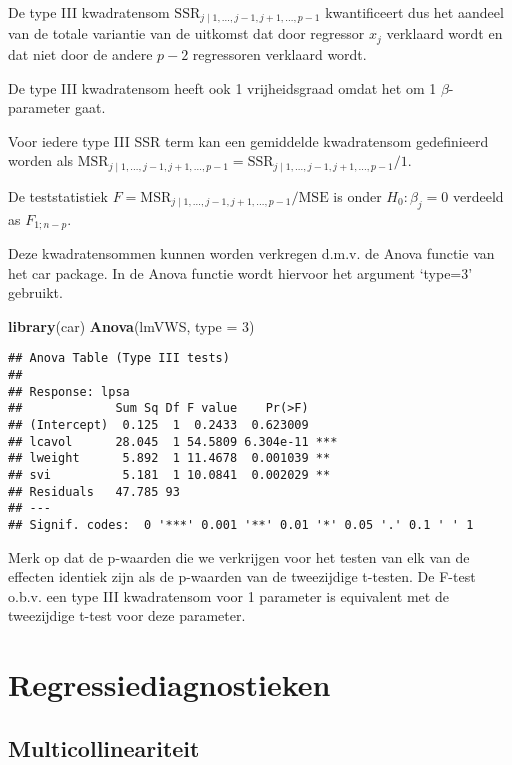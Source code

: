 \documentclass[12pt,dutch,coursenotes]{book}
\newenvironment{Shaded}{\begin{snugshade}}{\end{snugshade}}
\newcommand{\KeywordTok}[1]{\textcolor[rgb]{0.13,0.29,0.53}{\textbf{#1}}}
\newcommand{\DataTypeTok}[1]{\textcolor[rgb]{0.13,0.29,0.53}{#1}}
\newcommand{\DecValTok}[1]{\textcolor[rgb]{0.00,0.00,0.81}{#1}}
\newcommand{\NormalTok}[1]{#1}
\theoremstyle{definition}
\theoremstyle{definition}
\theoremstyle{definition}
\theoremstyle{remark}
\begin{document}
De type III kwadratensom
\(\text{SSR}_{j \mid 1,\ldots, j-1,j+1,\ldots, p-1}\) kwantificeert dus
het aandeel van de totale variantie van de uitkomst dat door regressor
\(x_j\) verklaard wordt en dat niet door de andere \(p-2\) regressoren
verklaard wordt.

De type III kwadratensom heeft ook 1 vrijheidsgraad omdat het om 1
\(\beta\)-parameter gaat.

Voor iedere type III SSR term kan een gemiddelde kwadratensom
gedefinieerd worden als
\(\text{MSR}_{j \mid 1,\ldots, j-1,j+1,\ldots, p-1}=\text{SSR}_{j \mid 1,\ldots, j-1,j+1,\ldots, p-1}/1\).

De teststatistiek
\(F=\text{MSR}_{j \mid 1,\ldots, j-1,j+1,\ldots, p-1}/\text{MSE}\) is
onder \(H_0:\beta_j=0\) verdeeld as \(F_{1;n-p}\).

Deze kwadratensommen kunnen worden verkregen d.m.v. de Anova functie van
het car package. In de Anova functie wordt hiervoor het argument
`type=3' gebruikt.

\begin{Shaded}
\begin{Highlighting}[]
\KeywordTok{library}\NormalTok{(car)}
\KeywordTok{Anova}\NormalTok{(lmVWS, }\DataTypeTok{type =} \DecValTok{3}\NormalTok{)}
\end{Highlighting}
\end{Shaded}

\begin{verbatim}
## Anova Table (Type III tests)
## 
## Response: lpsa
##             Sum Sq Df F value    Pr(>F)    
## (Intercept)  0.125  1  0.2433  0.623009    
## lcavol      28.045  1 54.5809 6.304e-11 ***
## lweight      5.892  1 11.4678  0.001039 ** 
## svi          5.181  1 10.0841  0.002029 ** 
## Residuals   47.785 93                      
## ---
## Signif. codes:  0 '***' 0.001 '**' 0.01 '*' 0.05 '.' 0.1 ' ' 1
\end{verbatim}

Merk op dat de p-waarden die we verkrijgen voor het testen van elk van
de effecten identiek zijn als de p-waarden van de tweezijdige t-testen.
De F-test o.b.v. een type III kwadratensom voor 1 parameter is
equivalent met de tweezijdige t-test voor deze parameter.

\section{Regressiediagnostieken}\label{regressiediagnostieken}

\subsection{Multicollineariteit}\label{multicollineariteit}
\end{document}
